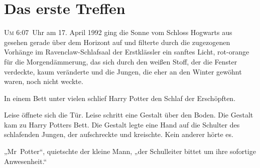 
\section{Das erste Treffen}

\lettrine{U}{m} 6:07~Uhr am 17. April 1992 ging die Sonne vom Schloss Hogwarts aus gesehen gerade über dem Horizont auf und filterte durch die zugezogenen Vorhänge im Ravenclaw-Schlafsaal der Erstklässler ein sanftes Licht, rot-orange für die Morgendämmerung, das sich durch den weißen Stoff, der die Fenster verdeckte, kaum veränderte und die Jungen, die eher an den Winter gewöhnt waren, noch nicht weckte.

In einem Bett unter vielen schlief Harry Potter den Schlaf der Erschöpften.





Leise öffnete sich die Tür. Leise schritt eine Gestalt über den Boden. Die Gestalt kam zu Harry Potters Bett. Die Gestalt legte eine Hand auf die Schulter des schlafenden Jungen, der aufschreckte und kreischte. Kein anderer hörte es.

„Mr~Potter“, quietschte der kleine Mann, „der Schulleiter bittet um ihre sofortige Anwesenheit.“

